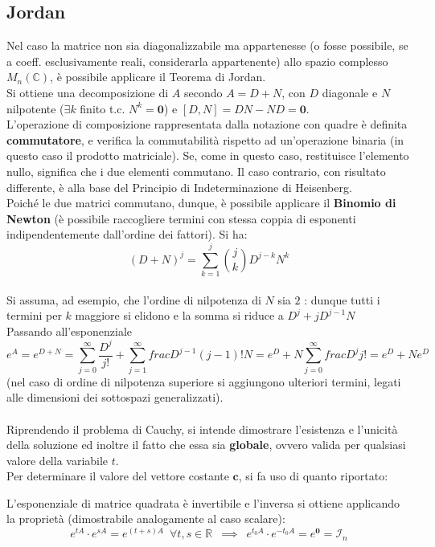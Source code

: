\documentclass[10pt, oneside]{book}
\theoremstyle{plain}
\begin{document}
\subsection{Jordan}
Nel caso la matrice non sia diagonalizzabile ma appartenesse (o fosse possibile, se a coeff. esclusivamente reali, considerarla appartenente) allo spazio complesso $M_n(\mathbb{C})$, è possibile applicare il Teorema di Jordan.
\\Si ottiene una decomposizione di $A$ secondo $A = D + N$, con $D$ diagonale e $N$ nilpotente ($\exists k$ finito t.c. $N^k = \mathbf{0}$) e $[D, N] = DN - ND = \mathbf{0}$. 
\\L'operazione di composizione rappresentata dalla notazione con quadre è definita \textbf{commutatore}, e verifica la commutabilità rispetto ad un'operazione binaria (in questo caso il prodotto matriciale). Se, come in questo caso, restituisce l'elemento nullo, significa che i due elementi commutano. Il caso contrario, con risultato differente, è alla base del Principio di Indeterminazione di Heisenberg.
\\Poiché le due matrici commutano, dunque, è possibile applicare il \textbf{Binomio di Newton} (è possibile raccogliere termini con stessa coppia di esponenti indipendentemente dall'ordine dei fattori). Si ha:
\[(D + N)^j = \sum\limits_{k=1}^j \binom{j}{k}D^{j - k}N^k\]
\\Si assuma, ad esempio, che l'ordine di nilpotenza di $N$ sia $2$ : dunque tutti i termini per $k$ maggiore si elidono e la somma si riduce a $D^j + j D^{j-1}N$
\\Passando all'esponenziale
\[e^A = e^{D+N} = \sum\limits_{j=0}^\infty \frac{D^j}{j!} + \sum\limits_{j = 1}^\infty frac{D^{j-1}}{(j-1)!}N = e^D + N \sum\limits_{j=0}^\infty frac{D^j}{j!} = e^D + N e^D\]
(nel caso di ordine di nilpotenza superiore si aggiungono ulteriori termini, legati alle dimensioni dei sottospazi generalizzati).
\\~\\Riprendendo il problema di Cauchy, si intende dimostrare l'esistenza e l'unicità della soluzione ed inoltre il fatto che essa sia \textbf{globale}, ovvero valida per qualsiasi valore della variabile $t$.
\\Per determinare il valore del vettore costante $\mathbf{c}$, si fa uso di quanto riportato:
\begin{oss}
L'esponenziale di matrice quadrata è invertibile e l'inversa si ottiene applicando la proprietà (dimostrabile analogamente al caso scalare):
\[e^{tA} \cdot e^{sA} = e^{(t+s)A} \enspace \forall t,s \in \mathbb{R} \enspace \implies \enspace e^{t_0 A} \cdot e^{- t_0 A} = e^{\mathbf{0}} = \mathcal{I}_n\]
\end{oss}
\end{document}
